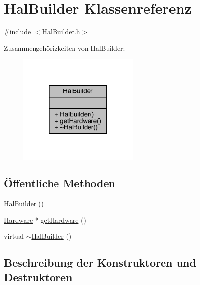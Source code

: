 \hypertarget{class_hal_builder}{}\section{Hal\+Builder Klassenreferenz}
\label{class_hal_builder}


{\ttfamily \#include $<$Hal\+Builder.\+h$>$}



Zusammengehörigkeiten von Hal\+Builder\+:
\nopagebreak
\begin{figure}[H]
\begin{center}
\leavevmode
\includegraphics[width=169pt]{class_hal_builder__coll__graph}
\end{center}
\end{figure}
\subsection*{Öffentliche Methoden}
\begin{DoxyCompactItemize}
\item 
\hyperlink{class_hal_builder_a722e3025d6c9659efcc011df559d0619}{Hal\+Builder} ()
\item 
\hyperlink{class_hardware}{Hardware} $\ast$ \hyperlink{class_hal_builder_addc8f400dfa9dee3f0d9de116512212f}{get\+Hardware} ()
\item 
virtual \hyperlink{class_hal_builder_af77e28e213c8aa028b18cf435e9ef3c8}{$\sim$\+Hal\+Builder} ()
\end{DoxyCompactItemize}


\subsection{Beschreibung der Konstruktoren und Destruktoren}
\hypertarget{class_hal_builder_a722e3025d6c9659efcc011df559d0619}{}\label{class_hal_builder_a722e3025d6c9659efcc011df559d0619} 
